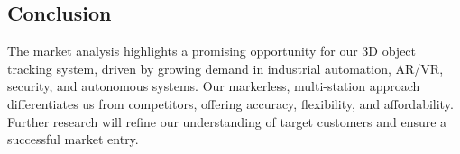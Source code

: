 \subsection{Conclusion}

The market analysis highlights a promising opportunity for our 3D object tracking system, driven by growing demand in industrial automation, AR/VR, security, and autonomous systems. Our markerless, multi-station approach differentiates us from competitors, offering accuracy, flexibility, and affordability. Further research will refine our understanding of target customers and ensure a successful market entry.
